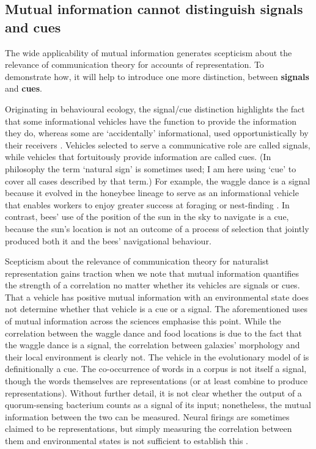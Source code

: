 \subsection{Mutual information cannot distinguish signals and cues}

The wide applicability of mutual information generates scepticism about the relevance of communication theory for accounts of representation.
To demonstrate how, it will help to introduce one more distinction, between \textbf{signals} and \textbf{cues}.

Originating in behavioural ecology, the signal/cue distinction highlights the fact that some informational vehicles have the function to provide the information they do, whereas some are `accidentally' informational, used opportunistically by their receivers \citep[$\S$1.2]{maynardsmith2003animal}.
Vehicles selected to serve a communicative role are called signals, while vehicles that fortuitously provide information are called cues.
(In philosophy the term `natural sign' is sometimes used; I am here using `cue' to cover all cases described by that term.)
For example, the waggle dance is a signal because it evolved in the honeybee lineage to serve as an informational vehicle that enables workers to enjoy greater success at foraging or nest-finding \citep{gould1975honey,riley2005flight}.
In contrast, bees' use of the position of the sun in the sky to navigate is a cue, because the sun's location is not an outcome of a process of selection that jointly produced both it and the bees' navigational behaviour.

Scepticism about the relevance of communication theory for naturalist representation gains traction when we note that mutual information quantifies the strength of a correlation no matter whether its vehicles are signals or cues.
That a vehicle has positive mutual information with an environmental state does not determine whether that vehicle is a cue or a signal.
The aforementioned uses of mutual information across the sciences emphasise this point.
While the correlation between the waggle dance and food locations is due to the fact that the waggle dance is a signal, the correlation between galaxies' morphology and their local environment is clearly not.
The vehicle in the evolutionary model of \citet{donaldson-matasci2010fitness} is definitionally a cue.
The co-occurrence of words in a corpus is not itself a signal, though the words themselves are representations (or at least combine to produce representations).
Without further detail, it is not clear whether the output of a quorum-sensing bacterium counts as a signal of its input; nonetheless, the mutual information between the two can be measured.
Neural firings are sometimes claimed to be representations, but simply measuring the correlation between them and environmental states is not sufficient to establish this \citep{rathkopf2017neural}.

